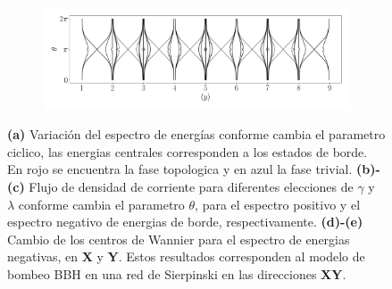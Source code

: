 \begin{figure}[h!]
     \begin{minipage}[h!]{1\textwidth}
        \begin{subfigure}[b!]{1.0 \textwidth}
            \caption{}
            \includegraphics[width=\textwidth]{Imagenes/Resultados_pump_Fractal/xy/wannier_centery.pdf}
        \end{subfigure}\hspace*{-0.5em}
    \end{minipage}\vspace*{-0.5em}
     
     
    \caption{\textbf{(a)} Variación del espectro de energías conforme cambia el parametro ciclico, las energias centrales corresponden a los estados de borde. En rojo se encuentra la fase topologica y en azul la fase trivial. \textbf{(b)-(c)} Flujo de densidad de corriente para diferentes elecciones de $\gamma$ y $\lambda$ conforme cambia el parametro $\theta$, para el espectro positivo y el espectro negativo de energias de borde, respectivamente. \textbf{(d)-(e)} Cambio de los centros de Wannier para el espectro de energias negativas, en \textbf{X} y \textbf{Y}. Estos resultados corresponden al modelo de bombeo BBH en una red de Sierpinski en las direcciones \textbf{XY}.}
    \label{fig:Pump_fractal_xy}
\end{figure}